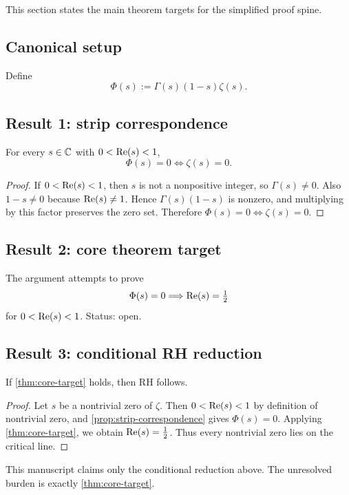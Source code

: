 This section states the main theorem targets for the simplified proof spine.

\subsection*{Canonical setup}
Define
\[
\Phi(s):=\Gamma(s)(1-s)\zeta(s).
\]

\subsection*{Result 1: strip correspondence}
\begin{proposition}
\label{prop:strip-correspondence}
For every $s\in\mathbb{C}$ with $0<\operatorname{Re}(s)<1$,
\[
\Phi(s)=0\iff \zeta(s)=0.
\]
\end{proposition}

\begin{proof}
If $0<\operatorname{Re}(s)<1$, then $s$ is not a nonpositive integer, so $\Gamma(s)\neq 0$.
Also $1-s\neq 0$ because $\operatorname{Re}(s)\neq 1$.
Hence $\Gamma(s)(1-s)$ is nonzero, and multiplying by this factor preserves the zero set.
Therefore $\Phi(s)=0\iff\zeta(s)=0$.
\end{proof}

\subsection*{Result 2: core theorem target}
\begin{drafttheorem}
\label{thm:core-target}
The argument attempts to prove
\[
\Phi(s)=0\Longrightarrow \operatorname{Re}(s)=\tfrac12
\]
for $0<\operatorname{Re}(s)<1$.
Status: open.
\end{drafttheorem}

\subsection*{Result 3: conditional RH reduction}
\begin{proposition}
\label{prop:rh-reduction-main-spine}
If \cref{thm:core-target} holds, then RH follows.
\end{proposition}

\begin{proof}
Let $s$ be a nontrivial zero of $\zeta$.
Then $0<\operatorname{Re}(s)<1$ by definition of nontrivial zero, and \cref{prop:strip-correspondence} gives $\Phi(s)=0$.
Applying \cref{thm:core-target}, we obtain $\operatorname{Re}(s)=\tfrac12$.
Thus every nontrivial zero lies on the critical line.
\end{proof}

\begin{remark}
This manuscript claims only the conditional reduction above.
The unresolved burden is exactly \cref{thm:core-target}.
\end{remark}
